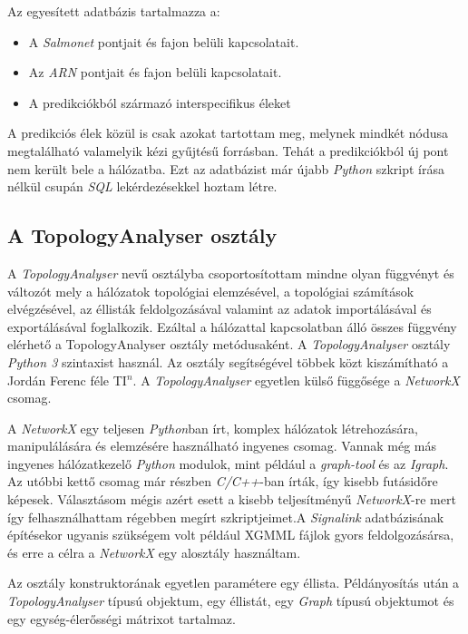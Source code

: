 \documentclass[a4paper,12pt]{article}
\begin{document}
		Az egyesített adatbázis tartalmazza a:
		\begin{itemize}
			\item A \textit{Salmonet} pontjait és fajon belüli kapcsolatait.
			\item Az \textit{ARN} pontjait és fajon belüli kapcsolatait.
			\item A predikciókból származó interspecifikus éleket
		\end{itemize}
		 
		 A predikciós élek közül is csak azokat tartottam meg, melynek mindkét nódusa megtalálható valamelyik kézi gyűjtésű forrásban. Tehát a predikciókból új pont nem került bele a hálózatba. Ezt az adatbázist már újabb \textit{Python} szkript írása nélkül csupán \textit{SQL} lekérdezésekkel hoztam létre.

	\subsection{A TopologyAnalyser osztály}
	
		A \textit{TopologyAnalyser} nevű osztályba csoportosítottam mindne olyan függvényt és változót mely a hálózatok topológiai elemzésével, a topológiai számítások elvégzésével, az éllisták feldolgozásával valamint az adatok importálásával és exportálásával foglalkozik. Ezáltal a hálózattal kapcsolatban álló összes függvény elérhető a TopologyAnalyser osztály metódusaként. A \textit{TopologyAnalyser} osztály \textit{Python 3} szintaxist használ. Az osztály segítségével többek közt kiszámítható a Jordán Ferenc féle TI$^n$. A \textit{TopologyAnalyser} egyetlen külső függősége a \textit{NetworkX} csomag. 
		
		A \textit{NetworkX} egy teljesen \textit{Python}ban írt, komplex hálózatok létrehozására, manipulálására és elemzésére használható ingyenes csomag. Vannak még más ingyenes hálózatkezelő \textit{Python} modulok, mint például a \textit{graph-tool} és az \textit{Igraph}. Az utóbbi kettő csomag már részben \textit{C/C++}-ban írták, így kisebb futásidőre képesek. Választásom mégis azért esett a kisebb teljesítményű \textit{NetworkX}-re mert így felhasználhattam régebben megírt szkriptjeimet.A \textit{Signalink} adatbázisának építésekor ugyanis szükségem volt például XGMML fájlok gyors feldolgozásársa, és erre a célra a \textit{NetworkX} egy alosztály használtam. 
		
		Az osztály konstruktorának egyetlen paramétere egy éllista. Példányosítás után a \textit{TopologyAnalyser} típusú objektum, egy éllistát, egy \textit{Graph} típusú objektumot és egy egység-élerősségi mátrixot tartalmaz.
		
\end{document}
